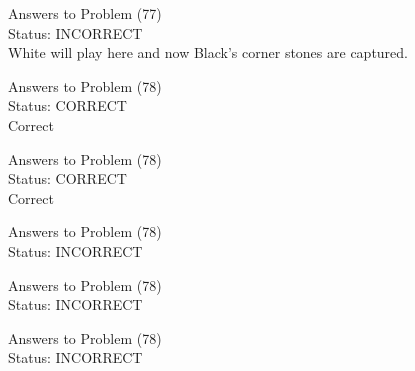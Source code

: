 \documentclass[11pt]{article}
\begin{document}
\begin{minipage}[t]{0.5\textwidth}
  {\centering
  
  Answers to Problem (77)\\
  Status: INCORRECT\\
  White will play here and now Black's corner stones are captured.\\
  }
\end{minipage}
\begin{minipage}[t]{0.5\textwidth}
  {\centering
  
  Answers to Problem (78)\\
  Status: CORRECT\\
  Correct\\
  }
\end{minipage}
\begin{minipage}[t]{0.5\textwidth}
  {\centering
  
  Answers to Problem (78)\\
  Status: CORRECT\\
  Correct\\
  }
\end{minipage}
\begin{minipage}[t]{0.5\textwidth}
  {\centering
  
  Answers to Problem (78)\\
  Status: INCORRECT\\
  
  }
\end{minipage}
\begin{minipage}[t]{0.5\textwidth}
  {\centering
  
  Answers to Problem (78)\\
  Status: INCORRECT\\
  
  }
\end{minipage}
\begin{minipage}[t]{0.5\textwidth}
  {\centering
  
  Answers to Problem (78)\\
  Status: INCORRECT\\
  
  }
\end{minipage}
\end{document}
